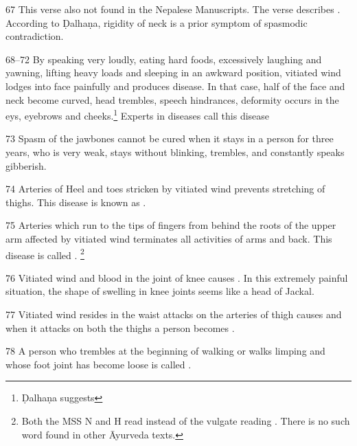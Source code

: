 \begin{translation}
\item[67] This verse also not found in the Nepalese Manuscripts. The verse describes . According to Ḍalhaṇa, rigidity of neck is a prior symptom of spasmodic contradiction. 

\item[68--72] By speaking very loudly, eating hard foods, excessively laughing and yawning, lifting heavy loads and sleeping in an awkward position, vitiated wind lodges into face painfully and produces  disease. In that case, half of the face and neck become curved, head trembles, speech hindrances, deformity occurs in the eys, eyebrows and cheeks.\footnote{Ḍalhaṇa suggests } Experts in diseases call this disease  

\item[73] Spasm of the jawbones cannot be cured when it stays in a person for three years, who is very weak, stays without blinking, trembles, and constantly speaks gibberish.

\item[74] Arteries of Heel and toes stricken by vitiated wind prevents stretching of thighs. This disease is known as .

\item[75] Arteries which run to the tips of fingers from behind the roots of the upper arm affected by vitiated wind terminates all activities of arms and back. This disease is called . \footnote{Both the MSS N and H read  instead of the vulgate reading . There is no such word found in other Āyurveda texts.}

\item[76] Vitiated wind and blood in the joint of knee causes . In this extremely painful situation, the shape of swelling in knee joints seems like a head of Jackal. 

\item[77] Vitiated wind resides in the waist attacks on the arteries of thigh causes  and when it attacks on both the thighs a person becomes .

\item[78] A person who trembles at the beginning of walking or walks limping and whose foot joint has become loose is called .


\end{translation}
